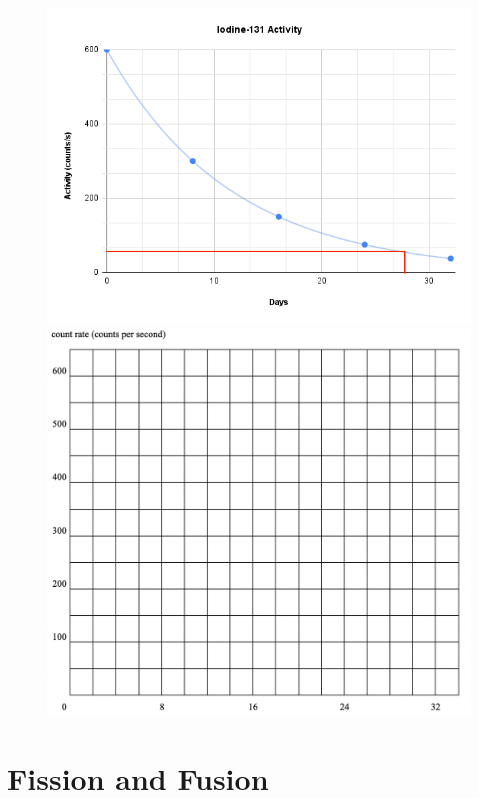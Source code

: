 \documentclass[12pt]{report}
\begin{document}
\begin{figure}[h]
	\centering
	{\includegraphics[width=\linewidth]{iodine-131-graph-answer.png}}
	{\includegraphics[width=\linewidth]{iodine-131-graph.png}}
\end{figure}

\newpage
\chapter{Fission and Fusion}
\end{document}

